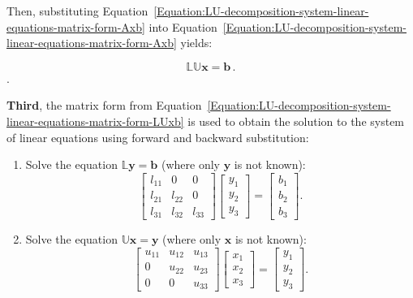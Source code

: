 Then, substituting Equation~\ref{Equation:LU-decomposition-system-linear-equations-matrix-form-Axb} into Equation~\ref{Equation:LU-decomposition-system-linear-equations-matrix-form-Axb} yields:

\begin{equation}\label{Equation:LU-decomposition-system-linear-equations-matrix-form-LUxb}
	\mathbb{LU}\textbf{x} = \textbf{b}\,.
\end{equation}.

\par \textbf{Third}, the matrix form from Equation~\ref{Equation:LU-decomposition-system-linear-equations-matrix-form-LUxb} is used to obtain the solution to the system of linear equations using forward and backward substitution:

\begin{enumerate}
	\item Solve the equation $ \mathbb{L}\textbf{y} = \textbf{b} $ (where only $ \textbf{y} $ is not known):
	\begin{equation}\label{Equation:LU-decomposition-solving-Lyb}
		\begin{bmatrix}
			l_{11} & 0      & 0          \\
			l_{21} & l_{22} & 0          \\
			l_{31} & l_{32} & l_{33}
		\end{bmatrix}
		\begin{bmatrix}
			y_{1} \\
			y_{2} \\
			y_{3}
		\end{bmatrix}
		=
		\begin{bmatrix}
			b_{1} \\
			b_{2} \\
			b_{3}
		\end{bmatrix}.
	\end{equation}
	\item Solve the equation $ \mathbb{U}\textbf{x} = \textbf{y} $ (where only $ \textbf{x} $ is not known):
	\begin{equation}\label{Equation:LU-decomposition-solving-Uxy}
		\begin{bmatrix}
			u_{11} & u_{12} & u_{13} \\
			0      & u_{22} & u_{23} \\
			0      & 0      & u_{33}
		\end{bmatrix}
		\begin{bmatrix}
			x_{1} \\
			x_{2} \\
			x_{3}
		\end{bmatrix}
		=
		\begin{bmatrix}
			y_{1} \\
			y_{2} \\
			y_{3}
		\end{bmatrix}.
	\end{equation}
\end{enumerate}

